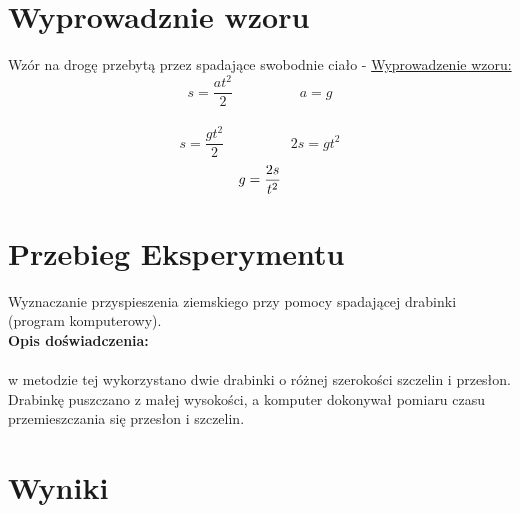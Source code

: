 \documentclass[11.5pt, arev]{article}
\begin{document}
\section{Wyprowadznie wzoru}
\vspace{10mm}
Wzór na drogę przebytą przez spadające swobodnie ciało - \underline{Wyprowadzenie wzoru:}
\vspace{3mm}
\begin{equation} 
    s = \frac{at^2}{2} \hspace{2cm} a=g  \end{equation}   \\ 
     \begin{equation} s = \frac{gt^2}{2} \hspace{2cm}  2s=gt^2 \end{equation} 
   \begin{equation}  g=\frac{2s}{t^2}\\ \end{equation} 
   \vspace{3mm}

\section{Przebieg Eksperymentu}
\vspace{10mm}

Wyznaczanie przyspieszenia ziemskiego przy pomocy spadającej drabinki 
(program komputerowy).\medskip
\textbf{\\Opis doświadczenia:\\}\\
w metodzie tej wykorzystano dwie drabinki o różnej szerokości szczelin i przesłon. Drabinkę puszczano z małej wysokości, a komputer dokonywał pomiaru czasu przemieszczania się przesłon i szczelin.


\section{Wyniki}
\vspace{5mm}
\\
\textbf{}\\
\vspace{5mm}
\end{document}
